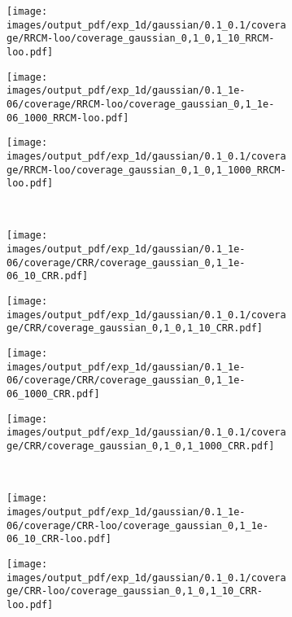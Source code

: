 \documentclass[a4paper,14pt]{extarticle}
\begin{document}
\begin{figure}
\begin{subfigure}[b]{0.25\linewidth}
  \end{subfigure}%
  \begin{subfigure}[b]{0.25\linewidth}
    \texttt{[image: images/output\_pdf/exp\_1d/gaussian/0.1\_0.1/coverage/RRCM-loo/coverage\_gaussian\_0,1\_0,1\_10\_RRCM-loo.pdf]}
  \end{subfigure}%
  \begin{subfigure}[b]{0.25\linewidth}
    \texttt{[image: images/output\_pdf/exp\_1d/gaussian/0.1\_1e-06/coverage/RRCM-loo/coverage\_gaussian\_0,1\_1e-06\_1000\_RRCM-loo.pdf]}
  \end{subfigure}%
  \begin{subfigure}[b]{0.25\linewidth}
    \texttt{[image: images/output\_pdf/exp\_1d/gaussian/0.1\_0.1/coverage/RRCM-loo/coverage\_gaussian\_0,1\_0,1\_1000\_RRCM-loo.pdf]}
  \end{subfigure}\\
  \begin{subfigure}[b]{0.25\linewidth}
    \texttt{[image: images/output\_pdf/exp\_1d/gaussian/0.1\_1e-06/coverage/CRR/coverage\_gaussian\_0,1\_1e-06\_10\_CRR.pdf]}
  \end{subfigure}%
  \begin{subfigure}[b]{0.25\linewidth}
    \texttt{[image: images/output\_pdf/exp\_1d/gaussian/0.1\_0.1/coverage/CRR/coverage\_gaussian\_0,1\_0,1\_10\_CRR.pdf]}
  \end{subfigure}%
  \begin{subfigure}[b]{0.25\linewidth}
    \texttt{[image: images/output\_pdf/exp\_1d/gaussian/0.1\_1e-06/coverage/CRR/coverage\_gaussian\_0,1\_1e-06\_1000\_CRR.pdf]}
  \end{subfigure}%
  \begin{subfigure}[b]{0.25\linewidth}
    \texttt{[image: images/output\_pdf/exp\_1d/gaussian/0.1\_0.1/coverage/CRR/coverage\_gaussian\_0,1\_0,1\_1000\_CRR.pdf]}
  \end{subfigure}\\
  \begin{subfigure}[b]{0.25\linewidth}
    \texttt{[image: images/output\_pdf/exp\_1d/gaussian/0.1\_1e-06/coverage/CRR-loo/coverage\_gaussian\_0,1\_1e-06\_10\_CRR-loo.pdf]}
  \end{subfigure}%
  \begin{subfigure}[b]{0.25\linewidth}
    \texttt{[image: images/output\_pdf/exp\_1d/gaussian/0.1\_0.1/coverage/CRR-loo/coverage\_gaussian\_0,1\_0,1\_10\_CRR-loo.pdf]}

\end{subfigure}
\end{figure}
\end{document}
